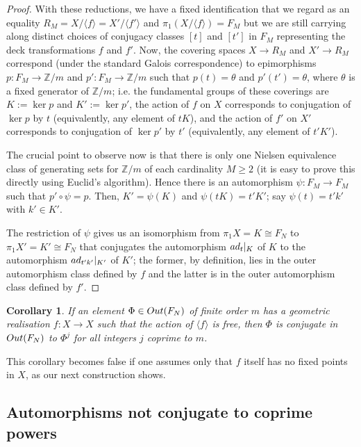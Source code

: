 \documentclass[11pt, a4 paper]{amsart}
\numberwithin{equation}{section}
\newtheorem{corollary}[theorem]{Corollary}
\theoremstyle{remark}
\theoremstyle{definition}
\def\Z{\mathbb Z}
\def\outN{{\rm{Out}}(F_N)}
\def\ad{{\rm{ad}}}
\def\<{\langle}
\def\>{\rangle}
\begin{document}
\begin{proof}
	With these reductions, we have a fixed identification 
	that we regard as an equality $R_M=X/\<f\> = X'/\<f'\>$
	and $\pi_1(X/\<f\>)=F_M$ 
	but we are still carrying along distinct choices 
	of conjugacy classes $[t]$ and $[t']$ in $F_M$ 
	representing the deck transformations $f$ and $f'$. 
	Now, the covering spaces $X\to R_M$ and $X'\to R_M$ 
	correspond (under the standard Galois correspondence) 
	to epimorphisms $p:F_M\to \Z/m$ and $p':F_M\to\Z/m$ 
	such that $p(t)=\theta$ and $p'(t')=\theta$, 
	where $\theta$ is a fixed generator of $\Z/m$; 
	i.e. the fundamental groups of these coverings are 
	$K:=\ker p$ and $K':=\ker p'$,
	the action of $f$ on $X$ corresponds to 
	conjugation of $\ker p$ by $t$ 
	(equivalently, any element of $tK$), and 
	the action of $f'$ on $X'$ corresponds to 
	conjugation of $\ker p'$ by $t'$ 
	(equivalently, any element of $t'K'$). 
	
	The crucial point to observe now
	is that there is only one Nielsen equivalence class 
	of generating sets for $\Z/m$ of each cardinality $M\ge 2$ 
	(it is easy to prove this directly 
	using Euclid's algorithm). 
	Hence there is an automorphism $\psi:F_M\to F_M$ 
	such that $p'\circ\psi = p$. 
	Then, $K' = \psi(K)$ and $\psi(tK)=t'K'$; 
	say $\psi(t) = t'k'$ with $k'\in K'$. 
	
	The restriction of $\psi$ gives us an isomorphism 
	from $\pi_1X = K \cong F_N$ to $\pi_1X'=K'\cong F_N$ 
	that conjugates	the automorphism $\ad_{t}|_K$ of $K$ 
	to the automorphism $\ad_{t'k'}|_{K'}$ of $K'$; 
	the former, by definition, 
	lies in the outer automorphism class defined by $f$ 
	and the latter 
	is in the outer automorphism class defined by $f'$. 
\end{proof}

\begin{corollary}
	If an element  $\Phi\in\outN$ of finite order $m$ 
	has a geometric realisation $f:X\to X$ 
	such that the action of $\<f\>$ is free, 
	then $\Phi$ is conjugate in $\outN$ to $\Phi^j$ 
	for all integers $j$ coprime to $m$. 
\end{corollary}

This corollary becomes false if one assumes only that $f$ itself has no fixed points in $X$,
as our next construction shows.


\subsection{Automorphisms not conjugate to coprime powers}
\end{document}

